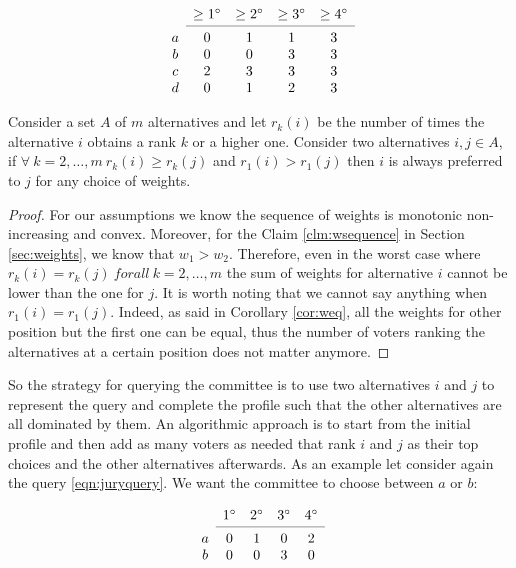 \[
\begin{array}{ccccc}
& \geq 1^\circ
& \geq 2^\circ
& \geq 3^\circ
& \geq 4^\circ \\
\cmidrule{2-5}
a 
& 0
& 1
& 1
& 3 \\
b
& 0
& 0
& 3
& 3 \\
c
& 2
& 3
& 3
& 3 \\
d
& 0
& 1
& 2
& 3 \\
\end{array}
\]


\begin{claim}
	Consider a set $A$ of $m$ alternatives and let $r_k(i)$ be the number of times the alternative $i$ obtains a rank $k$ or a higher one. Consider two alternatives $ i,j \in A$, if $\forall \ k=2, \dots,m \ r_k(i)\geq r_k(j)$ and $r_1(i) > r_1(j)$ then $i$ is always preferred to $j$ for any choice of weights.
\end{claim}

\begin{proof}
	For our assumptions we know the sequence of weights is monotonic non-increasing and convex. Moreover, for the Claim \ref{clm:wsequence} in Section \ref{sec:weights}, we know that $w_1 > w_2$. Therefore, even in the worst case where $r_k(i) = r_k(j) \ forall \ k=2, \dots,m$ the sum of weights for alternative $i$ cannot be lower than the one for $j$. It is worth noting that we cannot say anything when $r_1(i) = r_1(j)$. Indeed, as said in Corollary \ref{cor:weq}, all the weights for other position but the first one can be equal, thus the number of voters ranking the alternatives at a certain position does not matter anymore.	
\end{proof}

So the strategy for querying the committee is to use two alternatives $i$ and $j$ to represent the query and complete the profile such that the other alternatives are all dominated by them. An algorithmic approach is to start from the initial profile and then add as many voters as needed that rank $i$ and $j$ as their top choices and the other alternatives afterwards. As an example let consider again the query \ref*{eqn:juryquery}. We want the committee to choose between $a$ or $b$:

\[
\begin{array}{ccccc}
& 1^\circ
& 2^\circ
& 3^\circ
& 4^\circ \\
\cmidrule{2-5}
a 
& 0
& 1
& 0
& 2 \\
b
& 0
& 0
& 3
& 0 \\
\end{array}
\]

